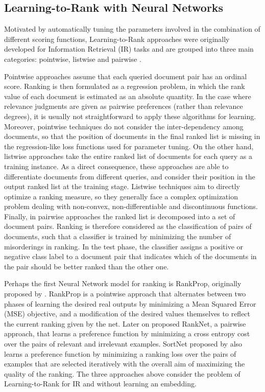\documentclass[10pt,journal,compsoc]{IEEEtran}
\begin{document}
\begin{sloppypar}
\subsection{Learning-to-Rank with Neural Networks}
Motivated by automatically tuning the parameters involved in the combination of different scoring functions, Learning-to-Rank approaches were originally developed for Information Retrieval (IR) tasks and are grouped into three main categories: pointwise, listwise and pairwise \cite{Liu:2009}.

\medskip

Pointwise approaches \cite{Crammer01, Li08} assume that each queried document pair has an ordinal score. Ranking is then formulated as a regression problem, in which the rank value of each document is estimated as an absolute quantity. In the case
where relevance judgments are given as pairwise preferences
(rather than relevance degrees), it is usually not straightforward to apply these algorithms for learning. Moreover, pointwise techniques do not consider the inter-dependency among documents, so that the position of documents in the final ranked list is missing in the regression-like loss functions used for parameter tuning. On the other hand, listwise approaches \cite{Shi:2010, Xu07, Xu08} take the entire ranked
list of documents for each query as a training instance. As
a direct consequence, these approaches are able to differentiate documents from different queries, and consider their position in the output ranked list at the training stage. Listwise techniques aim to directly optimize a ranking
measure, so they generally face a complex optimization problem dealing with non-convex, non-differentiable and discontinuous functions. Finally, in pairwise approaches \cite{Cohen99, Freund03, Joachims02, PessiotTUAG07} the ranked list is decomposed into a set of document pairs. Ranking is therefore considered as the classification of pairs of documents, such that a classifier is trained by minimizing the number of misorderings in ranking. In the test phase, the classifier assigns a positive or negative class label to a document pair that indicates which of the documents in the pair should be better ranked than the other one.

\smallskip

Perhaps the first Neural Network model for ranking is RankProp, originally proposed by \cite{Caruana:1995}. RankProp is a pointwise approach that alternates between two phases of learning the desired real outputs by minimizing a Mean Squared Error (MSE) objective, and a modification of the desired values themselves to reflect the current ranking given by the net. Later on \cite{DBLP:conf/icml/BurgesSRLDHH05} proposed RankNet, a pairwise approach, that learns a preference function by minimizing a cross entropy cost over the pairs of relevant and irrelevant examples. SortNet proposed by \cite{DBLP:conf/icann/RigutiniPMB08, DBLP:journals/tnn/RigutiniPMS11} also learns a preference function by minimizing a ranking loss over the pairs of examples that are selected iteratively with the overall aim of maximizing the quality of the ranking. The three approaches above consider the problem of Learning-to-Rank for IR and without learning an embedding.


\end{sloppypar}
\end{document}
